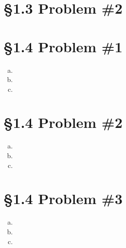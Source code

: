 \documentclass[11pt]{article}
\numberwithin{equation}{section}
\begin{document}
\section{\S 1.3 Problem \#2}

\section{\S 1.4 Problem \#1}
\begin{enumerate}[(a)]
\item
\item
\item
\end{enumerate}

\section{\S 1.4 Problem \#2}
\begin{enumerate}[(a)]
\item
\item
\item
\end{enumerate}

\section{\S 1.4 Problem \#3}
\begin{enumerate}[(a)]
\item
\item
\item
\end{enumerate}
\end{document}
